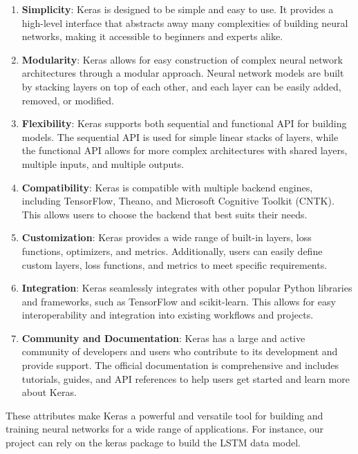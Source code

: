 	\begin{enumerate}
		\item \textbf{Simplicity}: Keras is designed to be simple and easy to use. It provides a high-level interface that abstracts away many complexities of building neural networks, making it accessible to beginners and experts alike.
		
		\item \textbf{Modularity}: Keras allows for easy construction of complex neural network architectures through a modular approach. Neural network models are built by stacking layers on top of each other, and each layer can be easily added, removed, or modified.
		
		\item \textbf{Flexibility}: Keras supports both sequential and functional API for building models. The sequential API is used for simple linear stacks of layers, while the functional API allows for more complex architectures with shared layers, multiple inputs, and multiple outputs.\cite{Attrik:2020}
		
		\item \textbf{Compatibility}: Keras is compatible with multiple backend engines, including TensorFlow, Theano, and Microsoft Cognitive Toolkit (CNTK). This allows users to choose the backend that best suits their needs.
		
		\item \textbf{Customization}: Keras provides a wide range of built-in layers, loss functions, optimizers, and metrics. Additionally, users can easily define custom layers, loss functions, and metrics to meet specific requirements.
		
		\item \textbf{Integration}: Keras seamlessly integrates with other popular Python libraries and frameworks, such as TensorFlow and scikit-learn. This allows for easy interoperability and integration into existing workflows and projects.
		
		\item \textbf{Community and Documentation}: Keras has a large and active community of developers and users who contribute to its development and provide support. The official documentation is comprehensive and includes tutorials, guides, and API references to help users get started and learn more about Keras.
	\end{enumerate}
	
	These attributes make Keras a powerful and versatile tool for building and training neural networks for a wide range of applications. For instance, our project can rely on the keras package to build the LSTM data model.

